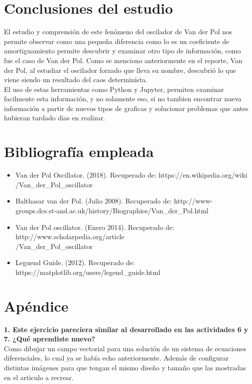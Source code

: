 \documentclass[12pt]{article}
\begin{document}
\section{Conclusiones del estudio}
El estudio y comprensión de este fenómeno del oscilador de Van der Pol nos permite observar como una pequeña diferencia como lo es un coeficiente de amortiguamiento permite descubrir y examinar otro tipo de información, como fue el caso de Van der Pol. Como se menciono anteriormente en el reporte, Van der Pol, al estudiar el oscilador forzado que lleva su nombre, descubrió lo que viene siendo un resultado del caos determinista. \\

El uso de estas herramientas como Python y Jupyter, permiten examinar facilmente esta información, y no solamente eso, si no tambien encontrar nueva información a partir de nuevos tipos de graficas y solucionar problemas que antes hubieran tardado dias en realizar. 

\section{Bibliografía empleada}
\begin{itemize}
    \item Van der Pol Oscillator. (2018). Recuperado de: https://en.wikipedia.org/wiki \\ /Van\_der\_Pol\_oscillator
    \item Balthasar van der Pol. (Julio 2008). Recuperado de: http://www-groups.dcs.st-and.ac.uk/history/Biographies/Van\_der\_Pol.html
    \item Van der Pol oscillator. (Enero 2014). Recuperado de: http://www.scholarpedia.org/article\\ /Van\_der\_Pol\_oscillator
    \item Leguend Guide. (2012). Recuperado de: https://matplotlib.org/users/legend\_guide.html
\end{itemize}

\section{Apéndice}
\noindent\textbf {1. Este ejercicio pareciera similar al desarrollado en las actividades 6 y 7. ¿Qué aprendiste nuevo?} \\

Como dibujar un campo vectorial para una solución de un sistema de ecuaciones diferenciales, lo cual ya se había echo anteriormente. Además de configurar distintas imágenes para que tengan el mismo diseño y tamaño que las mostradas en el articulo a recrear. \\
\end{document}
